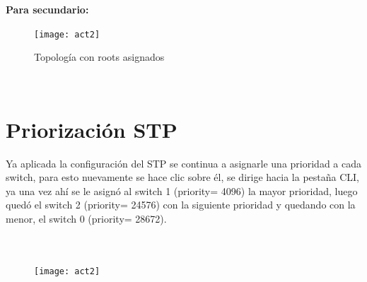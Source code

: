 \documentclass{udpreport}
\begin{document}
	{\large \bf{Para secundario: }}\\
	
	
	\begin{figure}[H]
	\centering
	\texttt{[image: act2]}%
	\caption{Topología con roots asignados}
	\end{figure}\\
	\vfill 

	\section{Priorización STP}
	   
	    Ya aplicada la configuración del STP se continua a asignarle una prioridad a cada switch,  para esto nuevamente se hace clic	sobre él, se dirige hacia la pestaña CLI, ya una vez ahí se le asignó al switch 1 (priority= 4096) la mayor prioridad, luego quedó el switch 2 (priority= 24576) con la siguiente prioridad y quedando con la menor, el switch 0 (priority= 28672).\\\\\
	    
	    
	 
        \begin{figure}[H]
	\centering
	\texttt{[image: act2]}
	
		\end{figure}

	\caption{Topología con prioridad}\\\\
	
\end{document}
